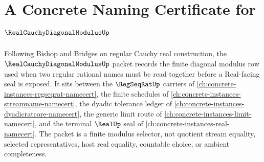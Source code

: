 \chapter{A Concrete Naming Certificate for $\RealCauchyDiagonalModulusUp$}
\label{ch:concrete-instances-real-cauchy-diagonal-modulus-namecert}

Following Bishop and Bridges on regular Cauchy real construction, the $\RealCauchyDiagonalModulusUp$ packet records the finite diagonal modulus row used when two regular rational names must be read together before a Real-facing seal is exposed. It sits between the $\RegSeqRatUp$ carriers of \autoref{ch:concrete-instances-regseqrat-namecert}, the finite schedules of \autoref{ch:concrete-instances-streamname-namecert}, the dyadic tolerance ledger of \autoref{ch:concrete-instances-dyadicratcore-namecert}, the generic limit route of \autoref{ch:concrete-instances-limit-namecert}, and the terminal $\RealUp$ seal of \autoref{ch:concrete-instances-real-namecert}. The packet is a finite modulus selector, not quotient stream equality, selected representatives, host real equality, countable choice, or ambient completeness.

